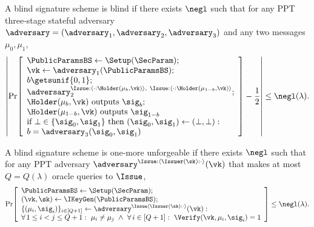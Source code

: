 \begin{definition}[Blindness]\label{def:bs-blindness}
	A blind signature scheme is blind if there exists \(\negl\) such that for any PPT three-stage stateful adversary
	\(\adversary=(\adversary_1,\adversary_2,\adversary_3)\) and any two messages \(\mu_0,\mu_1\),
	\[
	\left|\Pr\!\left[
	\begin{array}{l}
		\PublicParamsBS\gets \Setup(\SecParam);\\
		\vk\gets \adversary_1(\PublicParamsBS);\\ b\getsunif\{0,1\};\\
		\adversary_2^{\Issue:\langle \cdot: \Holder(\mu_b,\vk)\rangle ,~ \Issue:\langle \cdot: \Holder(\mu_{1-b},\vk)\rangle }; \\
		\Holder(\mu_b,\vk) \text{ outputs }\sig_b;\\
		\Holder(\mu_{1-b},\vk) \text{ outputs }\sig_{1-b}\\
		\text{if }\bot\in\{\sig_0,\sig_1\}\text{ then }(\sig_0,\sig_1)\gets(\bot,\bot):\\
		b=\adversary_3(\sig_0,\sig_1)
	\end{array}
	\right]-\frac{1}{2}\right|
	\le \negl(\lambda).
	\]
\end{definition}



\begin{definition}\label{def:bs-euf-cma}
A blind signature scheme is one-more unforgeable if there exists \(\negl\) such that for any PPT adversary
\(\adversary^{\Issue: \langle \Issuer(\sk): \cdot \rangle}(\vk)\) that makes at most \(Q=Q(\lambda)\) oracle queries to \(\Issue\),
\[
  \Pr\!\left[
    \begin{array}{l}
     	\PublicParamsBS \gets \Setup(\SecParam); \\
      (\vk,\sk)\gets \IKeyGen(\PublicParamsBS);\\
      \{(\mu_i,\sig_i)\}_{i\in[Q+1]}\gets \adversary^{\Issue \langle \Issuer(\sk):\cdot \rangle}(\vk):\\
      \forall\,1\le i<j\le Q+1:\ \mu_i\neq \mu_j\ \land\ \forall\,i\in[Q+1]:\ \Verify(\vk,\mu_i,\sig_i)=1
    \end{array}
  \right]
  \le \negl(\lambda).
\]
\end{definition}


